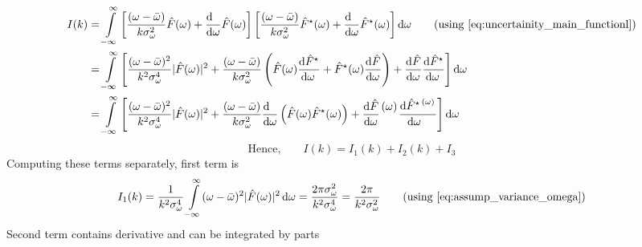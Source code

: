 \documentclass[11pt, a4paper]{article}
\newcommand{\numerator}[1]{\genfrac{}{}{0pt}{}{#1}{}}
\newcommand{\eqrefnp}[1]{\textup{\ref{#1}}}  %
\newcommand{\variance}[1]{\sigma_{#1}^{2}}
\newcommand{\stdev}[1]{\sigma_{#1}}
\newcommand{\diff}{\mathop{}\!\mathrm{d}}
\newcommand{\domega}{\diff \omega}
\newcommand{\derv}[1]{\frac{\diff \hfill}{\diff #1}}	%
\newcommand{\dervb}[2]{\derv{#1} \left(#2\right)}  %
\newcommand{\dervf}[2]{\frac{\diff #2}{\diff #1 \hfil}}	%
\newcommand{\dint}[2]{\int \limits_{#1}^{#2}}  %
\newcommand{\intinfty}{\dint{-\infty}{\infty}}	%
\begin{document}
	\begin{align*}
		I(k) & = \intinfty \left[\frac{(\omega - \bar{\omega})}{k \variance{\omega}} \hat{F}(\omega) + \derv{\omega}\hat{F}(\omega)\right] \left[\frac{(\omega - \bar{\omega})}{k \variance{\omega}} \hat{F}^{\star}(\omega) + \derv{\omega}\hat{F}^{\star}(\omega)\right] \domega \tag{using \eqrefnp{eq:uncertainity_main_functionl}} \\
		& = \intinfty \left[\frac{(\omega - \bar{\omega})^{2}}{k^{2} \stdev{\omega}^{4}} |\hat{F}(\omega)|^{2} + \frac{(\omega - \bar{\omega})}{k \variance{\omega}}\left(\hat{F}(\omega) \dervf{\omega}{\hat{F}^{\star}} + \hat{F}^{\star}(\omega) \dervf{\omega}{\hat{F}} \right) + \dervf{\omega}{\hat{F}} \dervf{\omega}{\hat{F}^{\star}}
		\right] \domega \\
		& = \intinfty \left[\frac{(\omega - \bar{\omega})^{2}}{k^{2} \stdev{\omega}^{4}} |\hat{F}(\omega)|^{2} + \frac{(\omega - \bar{\omega})}{k \variance{\omega}}\dervb{\omega}{\hat{F}(\omega) \hat{F}^{\star}(\omega)} + \dervf{\omega}{\hat{F}}\numerator{(\omega)} \dervf{\omega}{\hat{F}^{\star}\numerator{(\omega)}}
		\right] \domega
	\end{align*}
	\begin{equation}\label{eq:uncertainty_integral_triplet}
		\text{Hence,} \qquad I(k) = I_{1}(k) + I_{2}(k) + I_{3}
	\end{equation}
	Computing these terms separately, first term is
	\begin{equation}\label{eq:uncertainty_integral_part1}
		I_{1}(k) = \frac{1}{k^{2} \stdev{\omega}^{4}} \intinfty (\omega - \bar{\omega})^{2} |\hat{F}(\omega)|^{2} \domega = \frac{2 \pi \variance{\omega}}{k^{2} \stdev{\omega}^{4}} = \frac{2\pi}{k^{2} \variance{\omega}} \qquad \text{(using \eqrefnp{eq:assump_variance_omega})}
	\end{equation}
	Second term contains derivative and can be integrated by parts 
\end{document}

